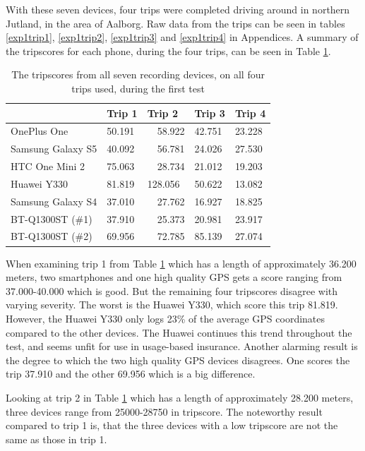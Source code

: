 With these seven devices, four trips were completed driving around in northern Jutland, in the area of Aalborg. Raw data from the trips can be seen in tables \ref{exp1trip1}, \ref{exp1trip2}, \ref{exp1trip3} and \ref{exp1trip4} in Appendices. A summary of the tripscores for each phone, during the four trips, can be seen in Table \ref{tab:smartphone_test_one}.

\begin{table}[tb]
\centering
\caption{The tripscores from all seven recording devices, on all four trips used, during the first test}
\label{tab:smartphone_test_one}
\begin{tabular}{|l|llll|}
\hline
\rowcolor{tablegreen}

                   & \textbf{Trip 1}    & \textbf{Trip 2}    & \textbf{Trip 3}    & \textbf{Trip 4}  \\\hline
OnePlus One        & 50.191   & \ \  58.922   & 42.751   & 23.228 \\
Samsung Galaxy S5  & 40.092   & \ \ 56.781   & 24.026   & 27.530 \\
HTC One Mini 2     & 75.063   & \ \ 28.734   & 21.012   & 19.203 \\
Huawei Y330        & 81.819   &  128.056   & 50.622   & 13.082 \\
Samsung Galaxy S4  & 37.010   & \ \ 27.762   & 16.927   & 18.825 \\
BT-Q1300ST (\#1)   & 37.910   & \ \ 25.373   & 20.981   & 23.917 \\
BT-Q1300ST (\#2)   & 69.956   & \ \ 72.785   & 85.139   & 27.074 \\\hline

\end{tabular}
\end{table}

When examining trip 1 from Table \ref{tab:smartphone_test_one} which has a length of approximately 36.200 meters, two smartphones and one high quality GPS gets a score ranging from 37.000-40.000 which is good. But the remaining four tripscores disagree with varying severity. The worst is the Huawei Y330, which score this trip 81.819. However, the Huawei Y330 only logs 23\% of the average GPS coordinates compared to the other devices. The Huawei continues this trend throughout the test, and seems unfit for use in usage-based insurance. Another alarming result is the degree to which the two high quality GPS devices disagrees. One scores the trip 37.910 and the other 69.956 which is a big difference.

Looking at trip 2 in Table \ref{tab:smartphone_test_one} which has a length of approximately 28.200 meters, three devices range from 25000-28750 in tripscore. The noteworthy result compared to trip 1 is, that the three devices with a low tripscore are not the same as those in trip 1.

